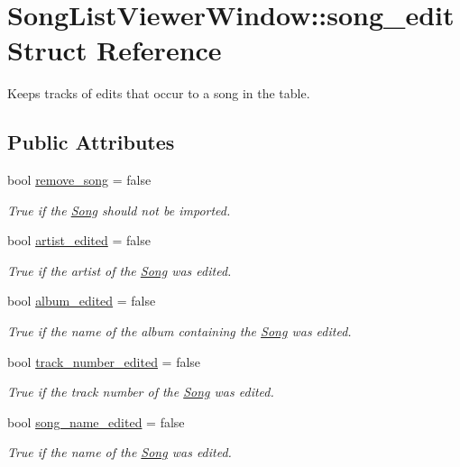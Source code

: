\hypertarget{struct_song_list_viewer_window_1_1song__edit}{}\section{Song\+List\+Viewer\+Window\+:\+:song\+\_\+edit Struct Reference}
\label{struct_song_list_viewer_window_1_1song__edit}


Keeps tracks of edits that occur to a song in the table.  


\subsection*{Public Attributes}
\begin{DoxyCompactItemize}
\item 
bool \mbox{\hyperlink{struct_song_list_viewer_window_1_1song__edit_ac10b306fd227c9b4f36a0c9d41f4e5ed}{remove\+\_\+song}} = false
\begin{DoxyCompactList}\small\item\em True if the \mbox{\hyperlink{class_song}{Song}} should not be imported. \end{DoxyCompactList}\item 
bool \mbox{\hyperlink{struct_song_list_viewer_window_1_1song__edit_ac5afb4d077978f41b62842de638ab60c}{artist\+\_\+edited}} = false
\begin{DoxyCompactList}\small\item\em True if the artist of the \mbox{\hyperlink{class_song}{Song}} was edited. \end{DoxyCompactList}\item 
bool \mbox{\hyperlink{struct_song_list_viewer_window_1_1song__edit_ac78cf078f8fb2fb5d482c80cff7bc860}{album\+\_\+edited}} = false
\begin{DoxyCompactList}\small\item\em True if the name of the album containing the \mbox{\hyperlink{class_song}{Song}} was edited. \end{DoxyCompactList}\item 
bool \mbox{\hyperlink{struct_song_list_viewer_window_1_1song__edit_ac26e42f1a25121026d3eb57eb9f141e1}{track\+\_\+number\+\_\+edited}} = false
\begin{DoxyCompactList}\small\item\em True if the track number of the \mbox{\hyperlink{class_song}{Song}} was edited. \end{DoxyCompactList}\item 
bool \mbox{\hyperlink{struct_song_list_viewer_window_1_1song__edit_a15419ad06dd36c199d9e41debc3072f7}{song\+\_\+name\+\_\+edited}} = false
\begin{DoxyCompactList}\small\item\em True if the name of the \mbox{\hyperlink{class_song}{Song}} was edited. \end{DoxyCompactList}\end{DoxyCompactItemize}


